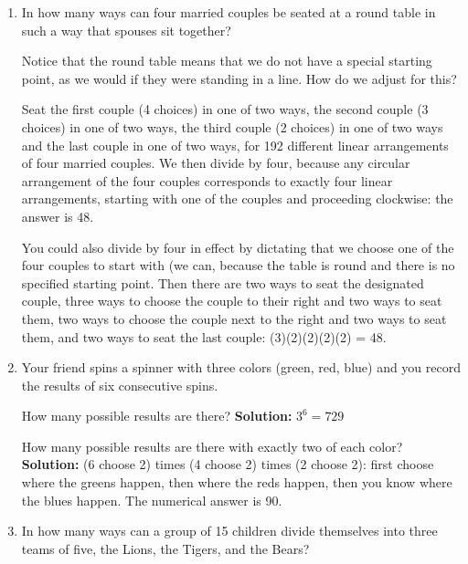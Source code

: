 \documentclass[12pt]{article}
\begin{document}
\begin{enumerate}
{\bf Solution:}  We need to choose the first card dealt (52 choices) then choose the last card dealt (3 choices) then we have 50 choices for the second card dealt, 49 for the fourth, and 48 for the fifth, numerical answer 18,345,600.

\newpage

\item  In how many ways can four married couples be seated at a round table in such a way that spouses sit together?

Notice that the round table means that we do not have a special starting point, as we would if they were standing in a line.  How do we adjust for this?

Seat the first couple (4 choices) in one of two ways, the second couple (3 choices) in one of two ways, the third couple (2 choices) in one of two ways and the last couple in one of two ways, for 192 different linear arrangements of four married couples.  We then divide by four, because any circular arrangement of the four couples corresponds to exactly four linear arrangements, starting with one of the couples and proceeding clockwise:  the answer is 48.

You could also divide by four in effect by dictating that we choose one of the four couples to start with (we can, because the table is round and there is no specified starting point.  Then there are two ways to seat the designated couple, three ways to choose the couple to their right and two ways to seat them, two ways to choose the couple next to the right and two ways to seat them, and two ways to seat the last couple:  (3)(2)(2)(2)(2) = 48.

\newpage

\item  Your friend spins a spinner with three colors (green, red, blue) and you record the results of six consecutive spins.

How many possible results are there?  {\bf Solution:}  $3^6 = 729$

How many possible results are there with exactly two of each color?  {\bf Solution:}  (6 choose 2) times (4 choose 2) times (2 choose 2):
first choose where the greens happen, then where the reds happen, then you know where the blues happen.  The numerical answer is 90.

\newpage

\item  In how many ways can a group of 15 children divide themselves into three teams of five, the Lions, the Tigers, and the Bears?


\end{enumerate}
\end{document}
